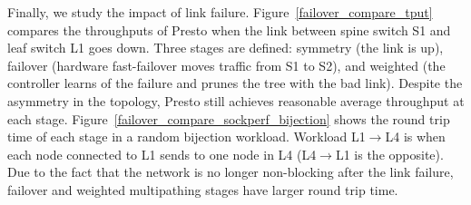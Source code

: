 Finally, we study the impact of link failure.
Figure~\ref{failover_compare_tput} compares the throughputs of
Presto when %
the link between spine switch S1 and leaf switch L1 goes down.
Three stages are defined: symmetry (the link is up), failover (hardware fast-failover moves traffic from S1 to S2), and weighted (the controller
learns of the failure and prunes the tree with the bad link).
Despite the asymmetry in the topology, Presto still achieves reasonable average throughput at 
each stage.
Figure~\ref{failover_compare_sockperf_bijection} shows the round trip time of
each stage in a random bijection workload. 
Workload L1$\rightarrow$L4 is when each node connected to L1 sends to one node in L4 
(L4$\rightarrow$L1 is the opposite).
Due to the fact that the network is no longer non-blocking after the link failure,
failover and weighted multipathing stages have larger round trip time.
